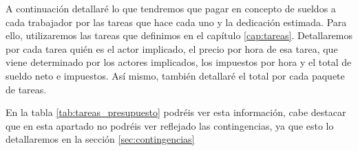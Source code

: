 \begin{table}[H]
    \centering
    \caption[Salarios netos medios por hora para cada rol]{Salarios netos medios por hora para cada rol (\cite{Glassdoor})}
    \label{tab:presupuesto_roles}
\end{table}

A continuación detallaré lo que tendremos que pagar en concepto de sueldos a cada trabajador por las tareas que hace cada uno y la dedicación estimada. Para ello, utilizaremos
las tareas que definimos en el capítulo \ref{cap:tareas}. Detallaremos por cada tarea quién es el actor implicado, el precio por hora de esa tarea, que viene determinado
por los actores implicados, los impuestos por hora y el total de sueldo neto e impuestos. Así mismo, también detallaré el total por cada paquete de tareas.

En la tabla \ref{tab:tareas_presupuesto} podréis ver esta información, cabe destacar que en esta apartado no podréis ver reflejado las contingencias, ya que esto
lo detallaremos en la sección \ref{sec:contingencias}

